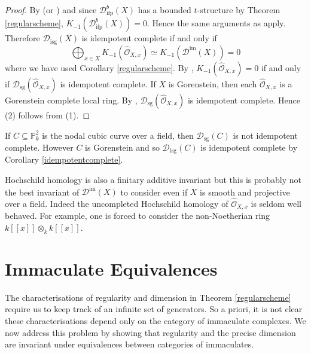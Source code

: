 \documentclass[12pt,oneside]{amsart}
\DeclareMathOperator{\immac}{im}
\DeclareMathOperator{\ifp}{ifp}
\DeclareMathOperator{\sg}{sg}
\DeclareMathOperator{\isg}{isg}
\begin{document}
\begin{proof}
By \cite[Theorem 9.1]{Sch06} (or \cite[Theorem 1.1]{AGH19}) and since $\mathcal{D}^b_{\ifp}(X)$ has a bounded $t$-structure by Theorem \ref{regularscheme}, $K_{-1}(\mathcal{D}^b_{\ifp}(X)) = 0$. Hence the same arguments as \cite[Section 4]{Orl11} apply. Therefore $\mathcal{D}_{\isg}(X)$ is idempotent complete if and only if 
\[
\bigoplus_{x \in X} K_{-1}(\widehat{\mathcal{O}}_{X,x}) \simeq K_{-1}(\mathcal{D}^{\immac}(X)) = 0
\]
where we have used Corollary \ref{regularscheme}. By \cite[Section 4]{Orl11}, $K_{-1}(\widehat{\mathcal{O}}_{X,x}) = 0$ if and only if $\mathcal{D}_{\sg}(\widehat{\mathcal{O}}_{X,x})$ is idempotent complete. If $X$ is Gorenstein, then each $\widehat{\mathcal{O}}_{X,x}$ is a Gorenstein complete local ring. By \cite[Lemma 3.1]{BK12}, $\mathcal{D}_{\sg}(\widehat{\mathcal{O}}_{X,x})$ is idempotent complete. Hence (2) follows from (1). 
\end{proof}

\begin{ex}
If $C \subseteq \mathbb{P}^2_k$ is the nodal cubic curve over a field, then $\mathcal{D}_{\sg}(C)$ is not idempotent complete. However $C$ is Gorenstein and so $\mathcal{D}_{\isg}(C)$ is idempotent complete by Corollary \ref{idempotentcomplete}.
\end{ex}

\begin{remark}
Hochschild homology is also a finitary additive invariant but this is probably not the best invariant of $\mathcal{D}^{\immac}(X)$ to consider even if $X$ is smooth and projective over a field. Indeed the uncompleted Hochschild homology of $\widehat{\mathcal{O}}_{X,x}$ is seldom well behaved. For example, one is forced to consider the non-Noetherian ring $k[[x]] \otimes_k k[[x]]$. 
\end{remark}



\section{Immaculate Equivalences}
\label{immacequivsec}

The characterisations of regularity and dimension in Theorem \ref{regularscheme} require us to keep track of an infinite set of generators. So a priori, it is not clear these characterisations depend only on the category of immaculate complexes. We now address this problem by showing that regularity and the precise dimension are invariant under equivalences between categories of immaculates. 
\end{document}
